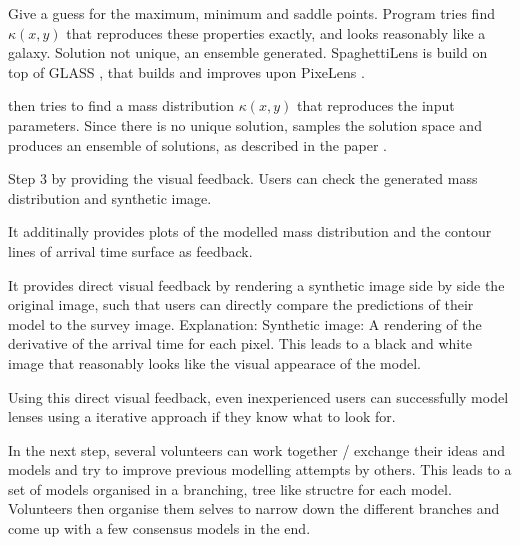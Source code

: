 Give a guess for the maximum, minimum and saddle points.  Program
tries find $\kappa(x,y)$ that reproduces these properties exactly, and
looks reasonably like a galaxy.  Solution not unique, an ensemble
generated.
SpaghettiLens is build on top of GLASS \citep{Lubini2012}, that builds and improves upon PixeLens \citep{Saha2004}.

\spl then tries to find a mass distribution $\kappa(x,y)$ that reproduces the input parameters.
Since there is no unique solution, \spl samples the solution space and produces an ensemble of solutions, as described in the paper \citep{Lubini2012}.

Step 3 by providing the visual feedback. Users can check the generated mass distribution and synthetic image.

It additinally provides plots of the modelled mass distribution and the contour lines of arrival time surface as feedback. 

It provides direct visual feedback by rendering a synthetic image side
by side the original image, such that users can directly compare the
predictions of their model to the survey image. Explanation: Synthetic
image: A rendering of the derivative of the arrival time for each
pixel. This leads to a black and white image that reasonably looks
like the visual appearace of the model.

Using this direct visual feedback, even inexperienced users can
successfully model lenses using a iterative approach if they know what
to look for.

In the next step, several volunteers can work together / exchange their ideas and models and try to improve previous modelling attempts by others.
This leads to a set of models organised in a branching, tree like structre for each model.
Volunteers then organise them selves to narrow down the different branches and come up with a few consensus models in the end.








